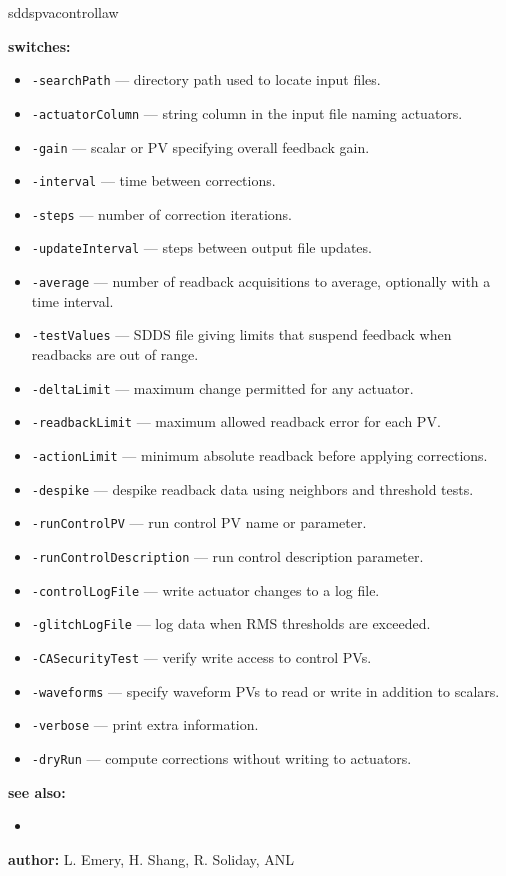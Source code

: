 \begin{sddsprog}{sddspvacontrollaw}
\item \textbf{switches:}
  \begin{itemize}
  \item {\tt -searchPath} --- directory path used to locate input files.
  \item {\tt -actuatorColumn} --- string column in the input file naming actuators.
  \item {\tt -gain} --- scalar or PV specifying overall feedback gain.
  \item {\tt -interval} --- time between corrections.
  \item {\tt -steps} --- number of correction iterations.
  \item {\tt -updateInterval} --- steps between output file updates.
  \item {\tt -average} --- number of readback acquisitions to average, optionally with a time interval.
  \item {\tt -testValues} --- SDDS file giving limits that suspend feedback when readbacks are out of range.
  \item {\tt -deltaLimit} --- maximum change permitted for any actuator.
  \item {\tt -readbackLimit} --- maximum allowed readback error for each PV.
  \item {\tt -actionLimit} --- minimum absolute readback before applying corrections.
  \item {\tt -despike} --- despike readback data using neighbors and threshold tests.
  \item {\tt -runControlPV} --- run control PV name or parameter.
  \item {\tt -runControlDescription} --- run control description parameter.
  \item {\tt -controlLogFile} --- write actuator changes to a log file.
  \item {\tt -glitchLogFile} --- log data when RMS thresholds are exceeded.
  \item {\tt -CASecurityTest} --- verify write access to control PVs.
  \item {\tt -waveforms} --- specify waveform PVs to read or write in addition to scalars.
  \item {\tt -verbose} --- print extra information.
  \item {\tt -dryRun} --- compute corrections without writing to actuators.
  \end{itemize}

\item \textbf{see also:}
  \begin{itemize}
  \item {}
  \end{itemize}

\item \textbf{author:} L. Emery, H. Shang, R. Soliday, ANL
\end{sddsprog}
